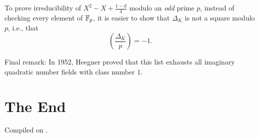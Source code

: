 \documentclass{article}
\newcommand{\leg}[2]{\genfrac{(}{)}{}{}{#1}{#2}}
\begin{document}
\begin{remark}
    To prove irreducibility of $X^2-X+\frac{1-d}{4}$ modulo an \emph{odd} prime $p$, instead of checking every element of $\mathbb{F}_{p}$, it is easier to show that $\Delta_K$ is not a square modulo $p$, i.e., that
    \[
        \leg{\Delta_K}{p}=-1.
    \]
\end{remark}

Final remark: In 1952, Heegner proved that this list exhausts all imaginary quadratic number fields with class number $1$.

\section*{The End}



\noindent Compiled on \todayymd.

\noindent\home
\end{document}
